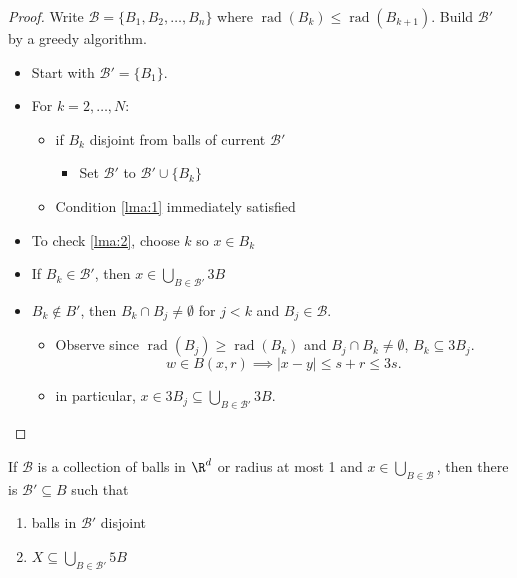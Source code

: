 \begin{proof}
  Write $\mathcal{B} = \{B_1, B_2, \ldots, B_n \}$ where $\operatorname{rad}(B_k) \leq \operatorname{rad}(B_{k+1})$. Build $\mathcal{B}'$ by a greedy algorithm.
  \begin{itemize}
    \item Start with $\mathcal{B}' = \{ B_1 \}$.
    \item For $k = 2, \ldots, N$:
      \begin{itemize}
        \item if $B_k$ disjoint from balls of current $\mathcal{B}'$
          \begin{itemize}
            \item Set $\mathcal{B}'$ to $\mathcal{B}' \cup \{ B_k \}$
          \end{itemize}
        \item Condition \ref{lma:1} immediately satisfied
      \end{itemize}
    \item To check \ref{lma:2}, choose $k$ so $x \in B_k$
    \item If $B_k \in \mathcal{B}'$, then $x \in \bigcup_{B \in \mathcal{B}'} 3B$
    \item $B_k \notin B'$, then $B_k \cap B_j \ne \emptyset$ for $j < k$ and $B_j \in \mathcal{B}$.
      \begin{itemize}
        \item Observe since $\operatorname{rad}(B_j) \geq \operatorname{rad}(B_k)$ and $B_j \cap B_k \ne \emptyset$, $B_k \subseteq 3B_j$.
          \[
            w \in B(x, r) \implies |x - y| \leq s + r \leq 3s.
          \]
        \item in particular, $x \in 3B_j \subseteq \bigcup_{B \in \mathcal{B}'} 3B$.
      \end{itemize}
  \end{itemize}
\end{proof}

\begin{lemma}
  If $\mathcal{B}$ is a collection of balls in $\R^d$ or radius at most 1 and $x \in \bigcup_{B \in \mathcal{B}}$, then there is $\mathcal{B}' \subseteq B$ such that
  \begin{enumerate}
    \item balls in $\mathcal{B}'$ disjoint
    \item $X \subseteq \bigcup_{B \in \mathcal{B}'} 5B$
  \end{enumerate}
\end{lemma}

